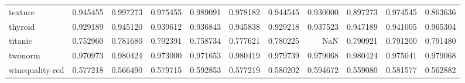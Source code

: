 \begin{tabular}{lrrrrrrrrrr}
texture         &   0.945455 &  0.997273 &  0.975455 &  0.989091 &  0.978182 &  0.944545 &  0.930000 &  0.897273 &  0.974545 &  0.863636 \\
thyroid         &   0.929189 &  0.945120 &  0.939612 &  0.936843 &  0.945838 &  0.929218 &  0.937523 &  0.947189 &  0.941005 &  0.965304 \\
titanic         &   0.752960 &  0.781680 &  0.792391 &  0.758734 &  0.777621 &  0.780225 &       NaN &  0.790921 &  0.791200 &  0.791480 \\
twonorm         &   0.970973 &  0.980424 &  0.973000 &  0.971653 &  0.980419 &  0.979739 &  0.979068 &  0.980424 &  0.975041 &  0.979068 \\
winequality-red &   0.577218 &  0.566490 &  0.579715 &  0.592853 &  0.577219 &  0.580202 &  0.594672 &  0.559080 &  0.581577 &  0.562882 \\
\bottomrule
\end{tabular}
